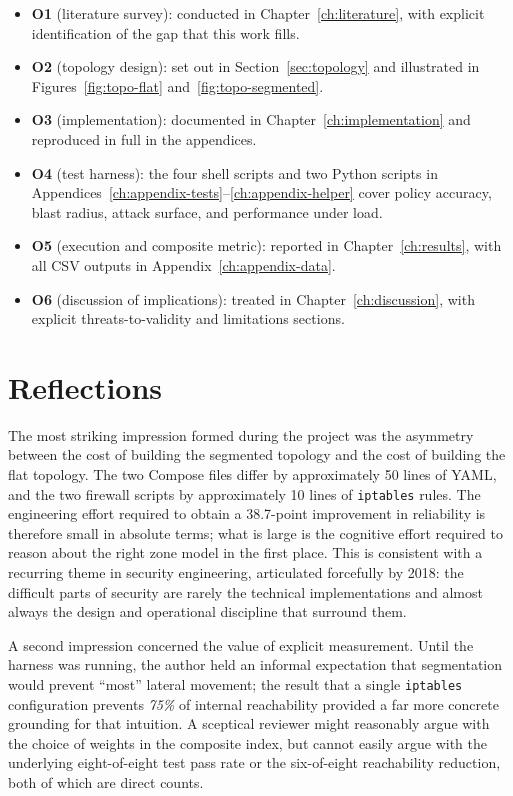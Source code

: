 \begin{itemize}[leftmargin=*]
    \item \textbf{O1} (literature survey): conducted in Chapter~\ref{ch:literature}, with explicit identification of the gap that this work fills.
    \item \textbf{O2} (topology design): set out in Section~\ref{sec:topology} and illustrated in Figures~\ref{fig:topo-flat} and~\ref{fig:topo-segmented}.
    \item \textbf{O3} (implementation): documented in Chapter~\ref{ch:implementation} and reproduced in full in the appendices.
    \item \textbf{O4} (test harness): the four shell scripts and two Python scripts in Appendices~\ref{ch:appendix-tests}--\ref{ch:appendix-helper} cover policy accuracy, blast radius, attack surface, and performance under load.
    \item \textbf{O5} (execution and composite metric): reported in Chapter~\ref{ch:results}, with all CSV outputs in Appendix~\ref{ch:appendix-data}.
    \item \textbf{O6} (discussion of implications): treated in Chapter~\ref{ch:discussion}, with explicit threats-to-validity and limitations sections.
\end{itemize}

\section{Reflections}

The most striking impression formed during the project was the asymmetry between the cost of building the segmented topology and the cost of building the flat topology. The two Compose files differ by approximately 50 lines of YAML, and the two firewall scripts by approximately 10 lines of \texttt{iptables} rules. The engineering effort required to obtain a 38.7-point improvement in reliability is therefore small in absolute terms; what is large is the cognitive effort required to reason about the right zone model in the first place. This is consistent with a recurring theme in security engineering, articulated forcefully by \textcite{Schneier}{2018}: the difficult parts of security are rarely the technical implementations and almost always the design and operational discipline that surround them.

A second impression concerned the value of explicit measurement. Until the harness was running, the author held an informal expectation that segmentation would prevent ``most'' lateral movement; the result that a single \texttt{iptables} configuration prevents \emph{75\%} of internal reachability provided a far more concrete grounding for that intuition. A sceptical reviewer might reasonably argue with the choice of weights in the composite index, but cannot easily argue with the underlying eight-of-eight test pass rate or the six-of-eight reachability reduction, both of which are direct counts.


